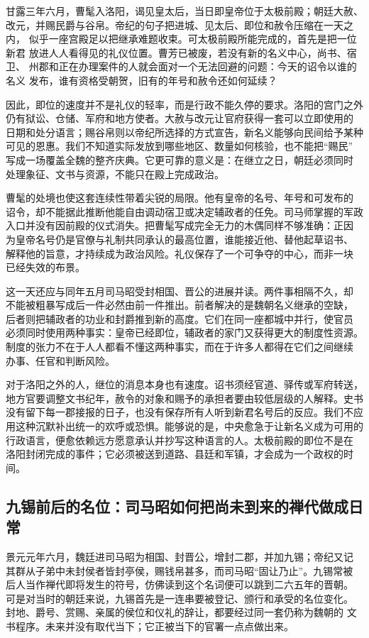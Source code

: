 甘露三年六月，曹髦入洛阳，谒见皇太后，当日即皇帝位于太极前殿；朝廷大赦、
改元，并赐民爵与谷帛。帝纪的句子把进城、见太后、即位和赦令压缩在一天之内，
似乎一座宫殿足以把继承难题收束。可太极前殿所能完成的，首先是把一位新君
放进人人看得见的礼仪位置。曹芳已被废，若没有新的名义中心，尚书、宿卫、
州郡和正在办理案件的人就会面对一个无法回避的问题：今天的诏令以谁的名义
发布，谁有资格受朝贺，旧有的年号和赦令还如何延续？

因此，即位的速度并不是礼仪的轻率，而是行政不能久停的要求。洛阳的宫门之外
仍有狱讼、仓储、军府和地方使者。大赦与改元让官府获得一套可以立即使用的
日期和处分语言；赐谷帛则以帝纪所选择的方式宣告，新名义能够向民间给予某种
可见的恩惠。我们不知道实际发放到哪些地区、数量如何核验，也不能把“赐民”
写成一场覆盖全魏的整齐庆典。它更可靠的意义是：在继立之日，朝廷必须同时
处理象征、文书与资源，不能只在殿上完成政治。

曹髦的处境也使这套连续性带着尖锐的局限。他有皇帝的名号、年号和可发布的
诏令，却不能据此推断他能自由调动宿卫或决定辅政者的任免。司马师掌握的军政
入口并没有因前殿的仪式消失。把曹髦写成完全无力的木偶同样不够准确：正因
为皇帝名号仍是官僚与礼制共同承认的最高位置，谁能接近他、替他起草诏书、
解释他的旨意，才持续成为政治风险。礼仪保存了一个可争夺的中心，而非一块
已经失效的布景。

这一天还应与同年五月司马昭受封相国、晋公的进展并读。两件事相隔不久，却
不能被粗暴写成后一件必然由前一件推出。前者解决的是魏朝名义继承的空缺，
后者则把辅政者的功业和封爵推到新的高度。它们在同一座都城中并行，使官员
必须同时使用两种事实：皇帝已经即位，辅政者的家门又获得更大的制度性资源。
制度的张力不在于人人都看不懂这两种事实，而在于许多人都得在它们之间继续
办事、任官和判断风险。

对于洛阳之外的人，继位的消息本身也有速度。诏书须经官道、驿传或军府转送，
地方官要调整文书纪年，赦令的对象和赐予的承担者要由较低层级的人解释。史书
没有留下每一郡接报的日子，也没有保存所有人听到新君名号后的反应。我们不应
用这种沉默补出统一的欢呼或恐惧。能够说的是，中央愈急于让新名义成为可用的
行政语言，便愈依赖远方愿意承认并抄写这种语言的人。太极前殿的即位不是在
洛阳封闭完成的事件；它必须被送到道路、县廷和军镇，才会成为一个政权的时间。

\subsection{九锡前后的名位：司马昭如何把尚未到来的禅代做成日常}

景元元年六月，魏廷进司马昭为相国、封晋公，增封二郡，并加九锡；帝纪又记
其群从子弟中未封侯者皆封亭侯，赐钱帛甚多，而司马昭“固让乃止”。九锡常被
后人当作禅代即将发生的符号，仿佛读到这个名词便可以跳到二六五年的晋朝。
可是对当时的朝廷来说，九锡首先是一连串要被登记、颁行和承受的名位变化。
封地、爵号、赏赐、亲属的侯位和仪礼的辞让，都要经过同一套仍称为魏朝的
文书程序。未来并没有取代当下；它正被当下的官署一点点做出来。

